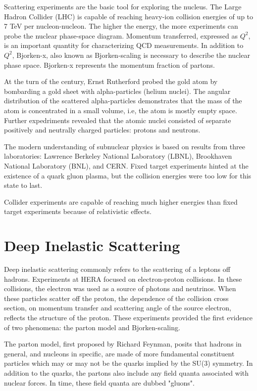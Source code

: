 Scattering experiments are the basic tool for exploring the nucleus. The Large Hadron Collider (LHC) is capable of reaching heavy-ion collision energies of up to 7 TeV per nucleon-nucleon. The higher the energy, the more experiments can probe the nuclear phase-space diagram. Momentum transferred, expressed as $Q^2$, is an important quantity for characterizing QCD measurements. In addition to $Q^2$, Bjorken-x, also known as Bjorken-scaling is necessary to describe the nuclear phase space. Bjorken-x represents the momentum fraction of partons. 

At the turn of the century, Ernst Rutherford probed the gold atom by bombarding a gold sheet with alpha-particles (helium nuclei). The angular distribution of the scattered alpha-particles demonstrates that the mass of the atom is concentrated in a small volume, i.e, the atom is mostly empty space. Further expedriments revealed that the atomic nuclei consisted of separate positively and neutrally charged particles: protons and neutrons. 

The modern understanding of subnuclear physics is based on results from three laboratories: Lawrence Berkeley National Laboratory (LBNL), Brookhaven National Laboratory (BNL), and CERN. Fixed target experiments hinted at the existence of a quark gluon plasma, but the collision energies were too low for this state to last. 

Collider experiments are capable of reaching much higher energies than fixed target experiments because of relativistic effects. 

\section{Deep Inelastic Scattering}

Deep inelastic scattering commonly refers to the scattering of a leptons off hadrons. Experiments at HERA focused on electron-proton collisions. In these collisions, the electron was used as a source of photons and neutrinos. When these particles scatter off the proton, the dependence of the collision cross section, on momentum transfer and scattering angle of the source electron, reflects the structure of the proton. These experiments provided the first evidence of two phenomena: the parton model and Bjorken-scaling. 

The parton model, first proposed by Richard Feynman, posits that hadrons in general, and nucleons in specific, are made of more fundamental constituent particles which may or may not be the quarks implied by the SU(3) symmetry. In addition to the quarks, the partons also include any field quanta associated with nuclear forces. In time, these field quanta are dubbed "gluons".

